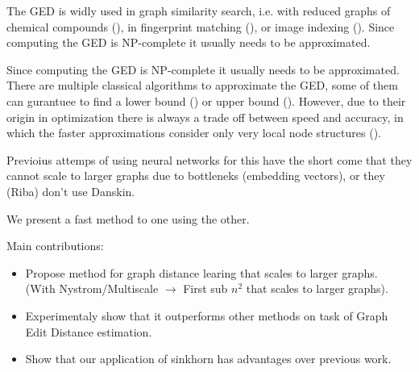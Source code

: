 The GED is widly used in graph similarity search, i.e. with reduced graphs of chemical compounds (\citealp{chem2006}), in fingerprint matching (\citealp{fingerprint2005}), or image indexing (\citealp{image_index2008}). Since computing the GED is NP-complete \cite{np_complete1998} it usually needs to be approximated.

Since computing the GED is NP-complete \cite{np_complete1998} it usually needs to be approximated. There are multiple classical algorithms to approximate the GED, some of them can gurantuee to find a lower bound (\cite{hungarian2009}) or upper bound (\citealp{hed2015}). However, due to their origin in optimization there is always a trade off between speed and accuracy, in which the faster approximations consider only very local node structures (\citealp{riba2018}).


Previoius attemps of using neural networks for this have the short come that they cannot scale to larger graphs due to bottleneks (embedding vectors), or they (Riba) don't use Danskin.

We present a fast method to one using the other.

Main contributions:
\begin{itemize}
    \item Propose method for graph distance learing that scales to larger graphs. \\ (With Nystrom/Multiscale $\rightarrow$ First sub $n^2$ that scales to larger graphs).
    \item Experimentaly show that it outperforms other methods on task of Graph Edit Distance estimation.
    \item Show that our application of sinkhorn has advantages over previous work.
\end{itemize}
